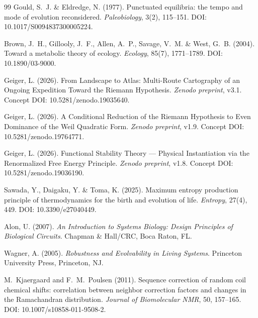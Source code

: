 \documentclass[12pt,a4paper]{article}
\theoremstyle{remark}
\begin{document}
\begin{thebibliography}{99}
Gould, S.~J. \& Eldredge, N. (1977).
\newblock Punctuated equilibria: the tempo and mode of evolution reconsidered.
\newblock \textit{Paleobiology}, 3(2), 115--151.
\newblock DOI: 10.1017/S0094837300005224.

Brown, J.~H., Gillooly, J.~F., Allen, A.~P., Savage, V.~M. \& West, G.~B. (2004).
\newblock Toward a metabolic theory of ecology.
\newblock \textit{Ecology}, 85(7), 1771--1789.
\newblock DOI: 10.1890/03-9000.

Geiger, L. (2026).
\newblock From Landscape to Atlas: Multi-Route Cartography of an Ongoing Expedition Toward the Riemann Hypothesis.
\newblock \textit{Zenodo preprint}, v3.1.
\newblock Concept DOI: 10.5281/zenodo.19035640.

Geiger, L. (2026).
\newblock A Conditional Reduction of the Riemann Hypothesis to Even Dominance of the Weil Quadratic Form.
\newblock \textit{Zenodo preprint}, v1.9.
\newblock Concept DOI: 10.5281/zenodo.19764771.

Geiger, L. (2026).
\newblock Functional Stability Theory --- Physical Instantiation via the Renormalized Free Energy Principle.
\newblock \textit{Zenodo preprint}, v1.8.
\newblock Concept DOI: 10.5281/zenodo.19036190.

Sawada, Y., Daigaku, Y. \& Toma, K. (2025).
\newblock Maximum entropy production principle of thermodynamics for the birth and evolution of life.
\newblock \textit{Entropy}, 27(4), 449.
\newblock DOI: 10.3390/e27040449.

Alon, U. (2007).
\newblock \textit{An Introduction to Systems Biology: Design Principles of Biological Circuits}.
\newblock Chapman \& Hall/CRC, Boca Raton, FL.

Wagner, A. (2005).
\newblock \textit{Robustness and Evolvability in Living Systems}.
\newblock Princeton University Press, Princeton, NJ.

M.~Kjaergaard and F.~M.~Poulsen (2011).
\newblock Sequence correction of random coil chemical shifts: correlation between neighbor correction factors and changes in the Ramachandran distribution.
\newblock \textit{Journal of Biomolecular NMR}, 50, 157--165.
\newblock DOI: 10.1007/s10858-011-9508-2.


\end{thebibliography}
\end{document}
